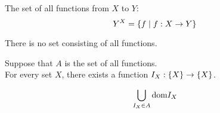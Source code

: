 \begin{frame}
  \begin{definition}
    The set of all functions from $X$ to $Y$:
    \[
      Y^{X} = \{f \mid f: X \to Y\}
    \]
  \end{definition}

  \pause
  \begin{center}
  \end{center}

  \pause
  \begin{theorem}
    There is no set consisting of all functions.
  \end{theorem}

  \pause
  \begin{center}
    Suppose  that $A$ is the set of all functions. \\[8pt]

    \pause
    For every set $X$, there exists a function $I_{X}: \{X\} \to \{X\}$.

    \pause
    \[
      \bigcup_{I_{X} \in A} \text{dom}{I_{X}}
    \]
  \end{center}
\end{frame}
